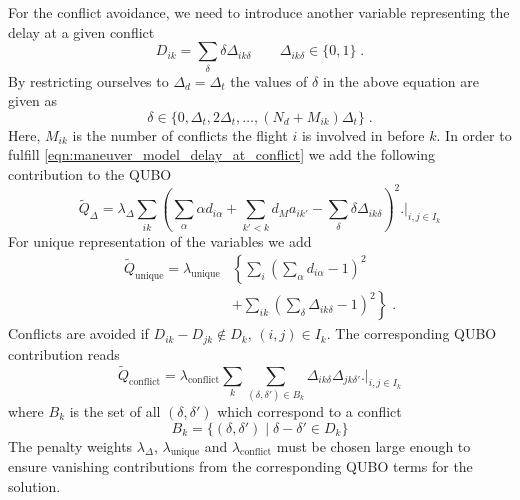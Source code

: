 For the conflict avoidance, we need to introduce another variable representing the delay at a given conflict
\begin{equation*}
    D_{ik} = \sum_\delta \delta \Delta_{ik\delta} \qquad \Delta_{ik\delta} \in \{0, 1\} \; .
\end{equation*}
By restricting ourselves to $\Delta_d = \Delta_t$ the values of $\delta$ in the above equation are given as
\begin{equation*}
    \delta \in \{0, \Delta_t, 2\Delta_t, \dots,  (N_d + M_{ik}) \Delta_t\} \; .
\end{equation*}
Here, $M_{ik}$ is the number of conflicts the flight $i$ is involved in before $k$.
In order to fulfill \eqref{eqn:maneuver_model_delay_at_conflict} we add the following contribution to the QUBO
\begin{equation*}
    \tilde Q_\Delta = \lambda_\Delta \sum_{ik}  \left( \sum_{\alpha} \alpha d_{i\alpha}  + \sum_{k'<k} d_M a_{ik'} - \sum_\delta \delta \Delta_{ik\delta}\right)^2 \biggl. \biggr|_{i, j \in I_k}
\end{equation*}
For unique representation of the variables we add 
\begin{align*}
    \tilde Q_\text{unique} = \lambda_\text{unique} & \left\{  \sum_i \left( \sum_\alpha d_{i\alpha} - 1 \right)^2 \right. \\
                      & \left. + \sum_{ik} \left( \sum_\delta \Delta_{ik\delta} - 1 \right)^2 \right\} \; .
\end{align*}
Conflicts are avoided if $D_{ik} - D_{jk} \notin D_k$, $(i, j) \in I_k$. 
The corresponding QUBO contribution reads
\begin{equation*}
    \tilde Q_\text{conflict} = \lambda_\text{conflict} \sum_k \sum_{(\delta, \delta') \in B_k} \Delta_{ik\delta} \Delta_{jk\delta'} \biggl. \biggr|_{i, j \in I_k}
\end{equation*}
where $B_k$ is the set of all $(\delta, \delta')$ which correspond to a conflict
\begin{equation*}
    B_k = \{(\delta, \delta') \; | \; \delta - \delta' \in D_k\}
\end{equation*}
The penalty weights $\lambda_\Delta$, $\lambda_\text{unique}$ and $\lambda_\text{conflict}$ must be chosen large enough to ensure vanishing contributions from the corresponding QUBO terms for the solution.

